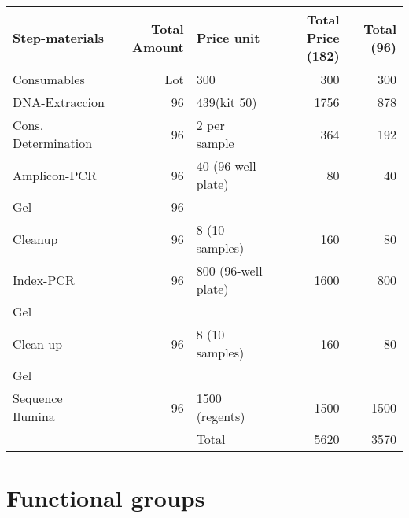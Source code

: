 \documentclass[11pt]{article}
\begin{document}
\begin{center}
\begin{tabular}{lrlrr}
 Step-materials       &  Total Amount  &  Price unit           &  Total Price (182)  &  Total (96)  \\
\hline
 Consumables          &           Lot  &  300                  &                300  &         300  \\
 DNA-Extraccion       &            96  &  439(kit 50)          &               1756  &         878  \\
 Cons. Determination  &            96  &  2 per sample         &                364  &         192  \\
 Amplicon-PCR         &            96  &  40 (96-well plate)   &                 80  &          40  \\
 Gel                  &            96  &                       &                     &              \\
 Cleanup              &            96  &  8 (10 samples)       &                160  &          80  \\
 Index-PCR            &            96  &  800 (96-well plate)  &               1600  &         800  \\
 Gel                  &                &                       &                     &              \\
 Clean-up             &            96  &  8 (10 samples)       &                160  &          80  \\
 Gel                  &                &                       &                     &              \\
 Sequence Ilumina     &            96  &  1500 (regents)       &               1500  &        1500  \\
\hline
                      &                &  Total                &               5620  &        3570  \\
\end{tabular}
\end{center}
\section*{Functional groups}
\label{sec-3}
\end{document}
